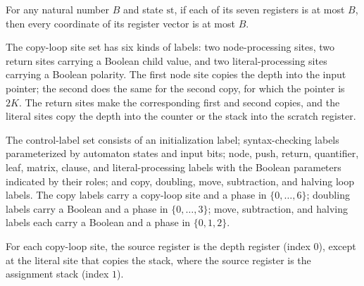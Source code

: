 \begin{lemma}
\label{Complexity.LogProg.TQBFARM.St.Bd.toV}
\leanok
{}
For any natural number $B$ and state $\mathrm{st}$, if each of its seven registers is at
most $B$, then every coordinate of its register vector is at most $B$.
\end{lemma}

\begin{definition}
\label{Complexity.LogProg.TQBFARM.CpS}
\leanok
The copy-loop site set has six kinds of labels: two node-processing sites, two return
sites carrying a Boolean child value, and two literal-processing sites carrying a
Boolean polarity. The first node site copies the depth into the input pointer; the
second does the same for the second copy, for which the pointer is $2K$. The return
sites make the corresponding first and second copies, and the literal sites copy the
depth into the counter or the stack into the scratch register.
\end{definition}

\begin{definition}
\label{Complexity.LogProg.TQBFARM.Lb}
\leanok
{}
The control-label set consists of an initialization label; syntax-checking labels
parameterized by automaton states and input bits; node, push, return, quantifier, leaf,
matrix, clause, and literal-processing labels with the Boolean parameters indicated by
their roles; and copy, doubling, move, subtraction, and halving loop labels. The copy
labels carry a copy-loop site and a phase in $\{0,\ldots,6\}$; doubling labels carry a
Boolean and a phase in $\{0,\ldots,3\}$; move, subtraction, and halving labels each
carry a Boolean and a phase in $\{0,1,2\}$.
\end{definition}

\begin{definition}
\label{Complexity.LogProg.TQBFARM.cpSrc}
\leanok
{}
For each copy-loop site, the source register is the depth register (index $0$), except
at the literal site that copies the stack, where the source register is the assignment
stack (index $1$).
\end{definition}

